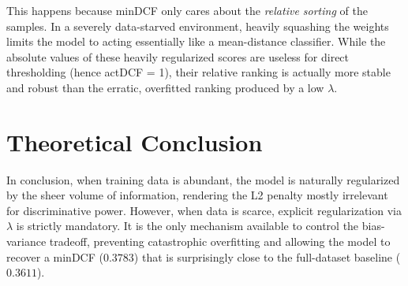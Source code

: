 This happens because minDCF only cares about the \textit{relative sorting} of the samples. In a severely data-starved environment, heavily squashing the weights limits the model to acting essentially like a mean-distance classifier. While the absolute values of these heavily regularized scores are useless for direct thresholding (hence actDCF = 1), their relative ranking is actually more stable and robust than the erratic, overfitted ranking produced by a low $\lambda$.

\section{Theoretical Conclusion}
In conclusion, when training data is abundant, the model is naturally regularized by the sheer volume of information, rendering the L2 penalty mostly irrelevant for discriminative power. However, when data is scarce, explicit regularization via $\lambda$ is strictly mandatory. It is the only mechanism available to control the bias-variance tradeoff, preventing catastrophic overfitting and allowing the model to recover a minDCF ($0.3783$) that is surprisingly close to the full-dataset baseline ($0.3611$).